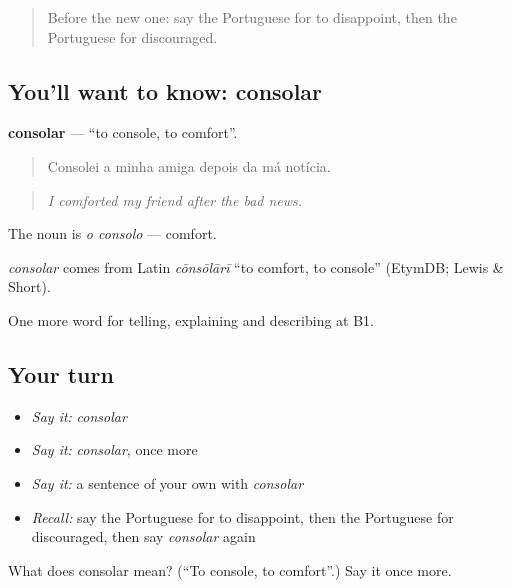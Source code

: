 \begin{quote}
Before the new one: say the Portuguese for to disappoint, then the Portuguese for discouraged.
\end{quote}

\subsection*{You'll want to know: consolar}
\textbf{consolar} — \textquotedblleft{}to console, to comfort\textquotedblright{}.

\begin{quote}
Consolei a minha amiga depois da má notícia.
\end{quote}

\begin{quote}
\emph{I comforted my friend after the bad news.}
\end{quote}

The noun is \emph{o consolo} — comfort.

\begin{cousinweb}
\emph{consolar} comes from Latin \emph{cōnsōlārī} \textquotedblleft{}to comfort, to console\textquotedblright{} (EtymDB; Lewis \& Short).
\end{cousinweb}

\begin{grammarlens}[title={What you've built}]
One more word for telling, explaining and describing at B1.
\end{grammarlens}

\subsection*{Your turn}
\begin{itemize}
\raggedright
  \item \emph{Say it:} \emph{consolar}
  \item \emph{Say it:} \emph{consolar}, once more
  \item \emph{Say it:} a sentence of your own with \emph{consolar}
  \item \emph{Recall:} say the Portuguese for to disappoint, then the Portuguese for discouraged, then say \emph{consolar} again
\end{itemize}

\begin{tcolorbox}[breakable,colback=teal!4,colframe=teal!35!black,title={Before you move on}]
What does consolar mean? (\textquotedblleft{}To console, to comfort\textquotedblright{}.) Say it once more.
\end{tcolorbox}
